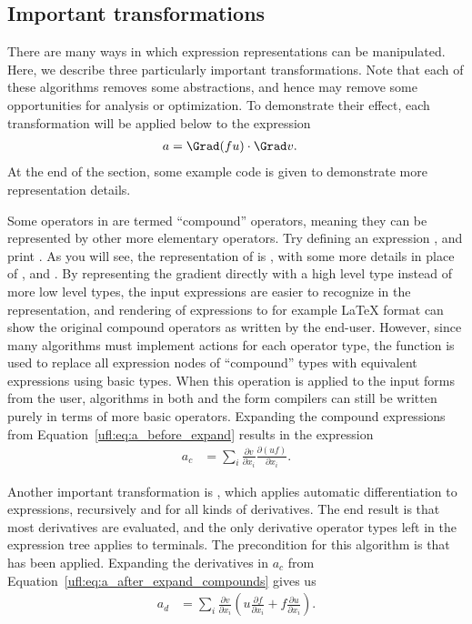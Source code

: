\subsection{Important transformations} \label{ufl:sec:expanding}

There are many ways in which expression representations can
be manipulated.  Here, we describe three particularly important
transformations.  Note that each of these algorithms removes some
abstractions, and hence may remove some opportunities for analysis or
optimization. To demonstrate their effect, each transformation will be
applied below to the expression
\begin{align} \label{ufl:eq:a_before_expand}
a   &= \Grad (f u) \cdot \Grad v.
\end{align}
At the end of the section, some example code is given to demonstrate
more representation details.

Some operators in \ufl{} are termed ``compound'' operators, meaning they
can be represented by other more elementary operators.  Try defining an
expression , and print . As
you will see, the representation of  is , with some more details in place of , 
and .  By representing the gradient directly with a high level
type  instead of more low level types, the input expressions are
easier to recognize in the representation, and rendering of expressions to
for example \LaTeX{} format can show the original compound operators as
written by the end-user.  However, since many algorithms must implement
actions for each operator type, the function  is
used to replace all expression nodes of ``compound'' types with equivalent
expressions using basic types. When this operation is applied to the input
forms from the user, algorithms in both \ufl{} and the form compilers
can still be written purely in terms of more basic operators.  Expanding
the compound expressions from Equation~\eqref{ufl:eq:a_before_expand}
results in the expression
\begin{align} \label{ufl:eq:a_after_expand_compounds}
a_c &= \sum_i \frac{\partial v}{\partial x_i} \frac{\partial (u f)}{\partial x_i}.
\end{align}

Another important transformation is , which
applies automatic differentiation to expressions, recursively and for
all kinds of derivatives.  The end result is that most derivatives are
evaluated, and the only derivative operator types left in the expression
tree applies to terminals. The precondition for this algorithm is that
 has been applied.  Expanding the derivatives in
$a_c$ from Equation~\eqref{ufl:eq:a_after_expand_compounds} gives us
\begin{align} \label{ufl:eq:a_after_expand_derivatives}
a_d &= \sum_{i} \frac{\partial v}{\partial x_i} (u \frac{\partial f}{\partial x_i} + f \frac{\partial u}{\partial x_i}).
\end{align}

